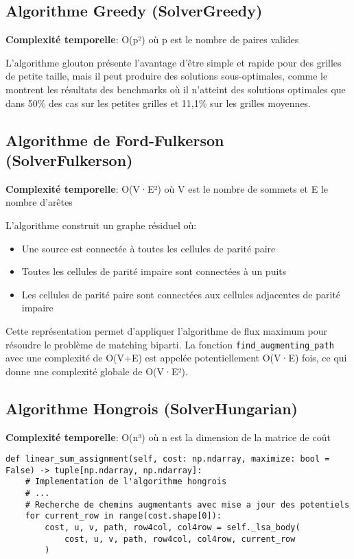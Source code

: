 \documentclass[11pt, a4paper]{article}
\begin{document}
\subsection{Algorithme Greedy (SolverGreedy)}

\textbf{Complexité temporelle}: O(p²) où p est le nombre de paires valides

L'algorithme glouton présente l'avantage d'être simple et rapide pour des grilles de petite taille, mais il peut produire des solutions sous-optimales, comme le montrent les résultats des benchmarks où il n'atteint des solutions optimales que dans 50\% des cas sur les petites grilles et 11,1\% sur les grilles moyennes.

\subsection{Algorithme de Ford-Fulkerson (SolverFulkerson)}

\textbf{Complexité temporelle}: O(V·E²) où V est le nombre de sommets et E le nombre d'arêtes

L'algorithme construit un graphe résiduel où:
\begin{itemize}
    \item Une source est connectée à toutes les cellules de parité paire
    \item Toutes les cellules de parité impaire sont connectées à un puits
    \item Les cellules de parité paire sont connectées aux cellules adjacentes de parité impaire
\end{itemize}

Cette représentation permet d'appliquer l'algorithme de flux maximum pour résoudre le problème de matching biparti. La fonction \texttt{find\_augmenting\_path} avec une complexité de O(V+E) est appelée potentiellement O(V·E) fois, ce qui donne une complexité globale de O(V·E²).

\subsection{Algorithme Hongrois (SolverHungarian)}

\textbf{Complexité temporelle}: O(n³) où n est la dimension de la matrice de coût

\begin{lstlisting}[caption=Appel principal de l'algorithme hongrois]
def linear_sum_assignment(self, cost: np.ndarray, maximize: bool = False) -> tuple[np.ndarray, np.ndarray]:
    # Implementation de l'algorithme hongrois
    # ...
    # Recherche de chemins augmentants avec mise a jour des potentiels
    for current_row in range(cost.shape[0]):
        cost, u, v, path, row4col, col4row = self._lsa_body(
            cost, u, v, path, row4col, col4row, current_row
        )
\end{lstlisting}
\end{document}
